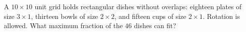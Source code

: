 A $10\times10$ unit grid holds rectangular dishes without overlaps: eighteen plates of size $3\times1$, thirteen bowls of size $2\times2$, and fifteen cups of size $2\times1$. Rotation is allowed. What maximum fraction of the $46$ dishes can fit?
